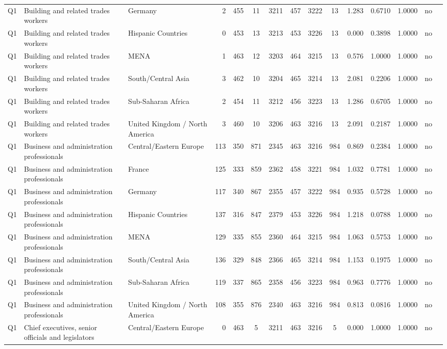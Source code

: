\begin{longtable}{lllrcccccccccll}
Q1 & Building and related trades workers & Germany & 2 & 455 & 11 & 3211 & 457 & 3222 & 13 & 1.283 & 0.6710 & 1.0000 & no \\
Q1 & Building and related trades workers & Hispanic Countries & 0 & 453 & 13 & 3213 & 453 & 3226 & 13 & 0.000 & 0.3898 & 1.0000 & no \\
Q1 & Building and related trades workers & MENA & 1 & 463 & 12 & 3203 & 464 & 3215 & 13 & 0.576 & 1.0000 & 1.0000 & no \\
Q1 & Building and related trades workers & South/Central Asia & 3 & 462 & 10 & 3204 & 465 & 3214 & 13 & 2.081 & 0.2206 & 1.0000 & no \\
Q1 & Building and related trades workers & Sub-Saharan Africa & 2 & 454 & 11 & 3212 & 456 & 3223 & 13 & 1.286 & 0.6705 & 1.0000 & no \\
Q1 & Building and related trades workers & United Kingdom / North America & 3 & 460 & 10 & 3206 & 463 & 3216 & 13 & 2.091 & 0.2187 & 1.0000 & no \\
Q1 & Business and administration professionals & Central/Eastern Europe & 113 & 350 & 871 & 2345 & 463 & 3216 & 984 & 0.869 & 0.2384 & 1.0000 & no \\
Q1 & Business and administration professionals & France & 125 & 333 & 859 & 2362 & 458 & 3221 & 984 & 1.032 & 0.7781 & 1.0000 & no \\
Q1 & Business and administration professionals & Germany & 117 & 340 & 867 & 2355 & 457 & 3222 & 984 & 0.935 & 0.5728 & 1.0000 & no \\
Q1 & Business and administration professionals & Hispanic Countries & 137 & 316 & 847 & 2379 & 453 & 3226 & 984 & 1.218 & 0.0788 & 1.0000 & no \\
Q1 & Business and administration professionals & MENA & 129 & 335 & 855 & 2360 & 464 & 3215 & 984 & 1.063 & 0.5753 & 1.0000 & no \\
Q1 & Business and administration professionals & South/Central Asia & 136 & 329 & 848 & 2366 & 465 & 3214 & 984 & 1.153 & 0.1975 & 1.0000 & no \\
Q1 & Business and administration professionals & Sub-Saharan Africa & 119 & 337 & 865 & 2358 & 456 & 3223 & 984 & 0.963 & 0.7776 & 1.0000 & no \\
Q1 & Business and administration professionals & United Kingdom / North America & 108 & 355 & 876 & 2340 & 463 & 3216 & 984 & 0.813 & 0.0816 & 1.0000 & no \\
Q1 & Chief executives, senior officials and legislators & Central/Eastern Europe & 0 & 463 & 5 & 3211 & 463 & 3216 & 5 & 0.000 & 1.0000 & 1.0000 & no \\

\end{longtable}
